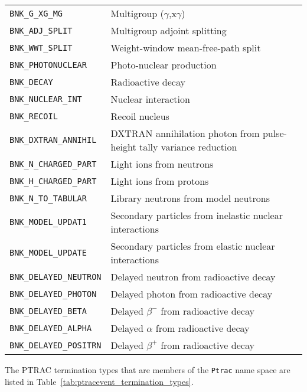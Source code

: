 \documentclass[11pt]{article}
\begin{document}
\begin{table}[]
\begin{center}
\begin{tabular}{lp{4.75in}}
        \texttt{BNK\_G\_XG\_MG}        & Multigroup ($\gamma$,x$\gamma$) \\
        \texttt{BNK\_ADJ\_SPLIT}       & Multigroup adjoint splitting \\
        \texttt{BNK\_WWT\_SPLIT}       & Weight-window mean-free-path split \\
        \texttt{BNK\_PHOTONUCLEAR}     & Photo-nuclear production \\
        \texttt{BNK\_DECAY}            & Radioactive decay \\
        \texttt{BNK\_NUCLEAR\_INT}     & Nuclear interaction \\
        \texttt{BNK\_RECOIL}           & Recoil nucleus \\
        \texttt{BNK\_DXTRAN\_ANNIHIL}  & DXTRAN annihilation photon from pulse-height tally variance reduction \\
        \texttt{BNK\_N\_CHARGED\_PART} & Light ions from neutrons \\
        \texttt{BNK\_H\_CHARGED\_PART} & Light ions from protons \\
        \texttt{BNK\_N\_TO\_TABULAR}   & Library neutrons from model neutrons \\
        \texttt{BNK\_MODEL\_UPDAT1}    & Secondary particles from inelastic nuclear interactions \\
        \texttt{BNK\_MODEL\_UPDATE}    & Secondary particles from elastic nuclear interactions \\
        \texttt{BNK\_DELAYED\_NEUTRON} & Delayed neutron from radioactive decay \\
        \texttt{BNK\_DELAYED\_PHOTON}  & Delayed photon from radioactive decay \\
        \texttt{BNK\_DELAYED\_BETA}    & Delayed $\beta^-$ from radioactive decay \\
        \texttt{BNK\_DELAYED\_ALPHA}   & Delayed $\alpha$ from radioactive decay \\
        \texttt{BNK\_DELAYED\_POSITRN} & Delayed $\beta^+$ from radioactive decay \\
      \bottomrule
    \end{tabular}
  \end{center}
\end{table}

The PTRAC termination types that are members of the \texttt{Ptrac} name space
are listed in Table~\ref{tab:ptracevent_termination_types}.
\end{document}
